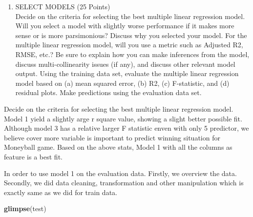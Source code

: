 \documentclass[]{article}
\newenvironment{Shaded}{\begin{snugshade}}{\end{snugshade}}
\newcommand{\KeywordTok}[1]{\textcolor[rgb]{0.13,0.29,0.53}{\textbf{#1}}}
\newcommand{\NormalTok}[1]{#1}
\providecommand{\tightlist}{%
  \setlength{\itemsep}{0pt}\setlength{\parskip}{0pt}}
\begin{document}
\begin{enumerate}
\def\labelenumi{\arabic{enumi}.}
\setcounter{enumi}{3}
\tightlist
\item
  SELECT MODELS (25 Points)\\
  Decide on the criteria for selecting the best multiple linear
  regression model. Will you select a model with slightly worse
  performance if it makes more sense or is more parsimonious? Discuss
  why you selected your model. For the multiple linear regression model,
  will you use a metric such as Adjusted R2, RMSE, etc.? Be sure to
  explain how you can make inferences from the model, discuss
  multi-collinearity issues (if any), and discuss other relevant model
  output. Using the training data set, evaluate the multiple linear
  regression model based on (a) mean squared error, (b) R2, (c)
  F-statistic, and (d) residual plots. Make predictions using the
  evaluation data set.
\end{enumerate}

Decide on the criteria for selecting the best multiple linear regression
model. Model 1 yield a slightly arge r square value, showing a slight
better possible fit. Although model 3 has a relative larger F statistic
enven with only 5 predictor, we believe cover more variable is important
to predict winning situation for Moneyball game. Based on the above
stats, Model 1 with all the columns as feature is a best fit.

In order to use model 1 on the evaluation data. Firstly, we overview the
data. Secondly, we did data cleaning, transformation and other
manipulation which is exactly same as we did for train data.

\begin{Shaded}
\begin{Highlighting}[]
\KeywordTok{glimpse}\NormalTok{(test)}
\end{Highlighting}
\end{Shaded}
\end{document}
